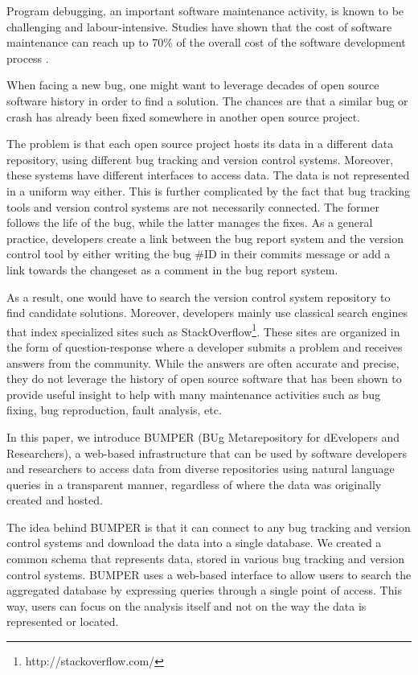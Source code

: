 \documentclass[conference]{IEEEtran}
\begin{document}
Program debugging, an important software maintenance activity, is known to be challenging and labour-intensive. Studies have shown that the cost of software maintenance can reach up to 70\% of the overall cost of the software development process \cite{Pressman2005}.

When facing a new bug, one might want to leverage decades of open source software history in order to find a solution. The chances are that a similar bug or crash has already been fixed somewhere in another open source project.

The problem is that each open source project hosts its data in a different data repository, using different bug tracking and version control systems. Moreover, these systems have different interfaces to access data.
The data is not represented in a uniform way either. This is further complicated by the fact that bug tracking tools and version control systems are not necessarily connected. The former follows the life of the bug, while the latter manages the fixes.
As a general practice, developers create a link between the bug report system and the version control tool by either writing the bug \#ID in their commits message or add a link towards the changeset as a comment in the bug report system.

As a result, one would have to search the version control system repository to find candidate solutions.
 Moreover, developers mainly use classical search engines that index specialized sites such as StackOverflow\footnote{http://stackoverflow.com/}. These sites are organized in the form of question-response where a developer submits a problem and receives answers from the community. While the answers are often accurate and precise, they do not leverage the history of open source software that has been shown to provide useful insight to help with many maintenance activities such as bug fixing\cite{Saha2014}, bug reproduction\cite{Chen2013a}, fault analysis\cite{Nessa2008}, etc.

In this paper, we introduce BUMPER (BUg Metarepository for dEvelopers and Researchers), a web-based infrastructure that can be used by software developers and researchers to access data from diverse repositories using natural language queries in a transparent manner, regardless of where the data was originally created and hosted.

The idea behind BUMPER is that it can connect to any bug tracking and version control systems and download the data into a single database. We created a common schema that represents data, stored in various bug tracking and version control systems.
BUMPER uses a web-based interface to allow users to search the aggregated database by expressing queries through a single point of access.
This way, users can focus on the analysis itself and not on the way the data is represented or located.
\end{document}
